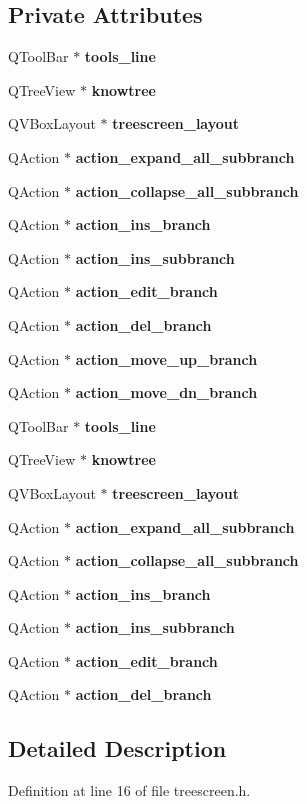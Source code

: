\subsection*{Private Attributes}
\begin{CompactItemize}
\item 
QTool\-Bar $\ast$ {\bf tools\_\-line}
\item 
QTree\-View $\ast$ {\bf knowtree}
\item 
QVBox\-Layout $\ast$ {\bf treescreen\_\-layout}
\item 
QAction $\ast$ {\bf action\_\-expand\_\-all\_\-subbranch}
\item 
QAction $\ast$ {\bf action\_\-collapse\_\-all\_\-subbranch}
\item 
QAction $\ast$ {\bf action\_\-ins\_\-branch}
\item 
QAction $\ast$ {\bf action\_\-ins\_\-subbranch}
\item 
QAction $\ast$ {\bf action\_\-edit\_\-branch}
\item 
QAction $\ast$ {\bf action\_\-del\_\-branch}
\item 
QAction $\ast$ {\bf action\_\-move\_\-up\_\-branch}
\item 
QAction $\ast$ {\bf action\_\-move\_\-dn\_\-branch}
\item 
QTool\-Bar $\ast$ {\bf tools\_\-line}
\item 
QTree\-View $\ast$ {\bf knowtree}
\item 
QVBox\-Layout $\ast$ {\bf treescreen\_\-layout}
\item 
QAction $\ast$ {\bf action\_\-expand\_\-all\_\-subbranch}
\item 
QAction $\ast$ {\bf action\_\-collapse\_\-all\_\-subbranch}
\item 
QAction $\ast$ {\bf action\_\-ins\_\-branch}
\item 
QAction $\ast$ {\bf action\_\-ins\_\-subbranch}
\item 
QAction $\ast$ {\bf action\_\-edit\_\-branch}
\item 
QAction $\ast$ {\bf action\_\-del\_\-branch}
\end{CompactItemize}


\subsection{Detailed Description}




Definition at line 16 of file treescreen.h.

